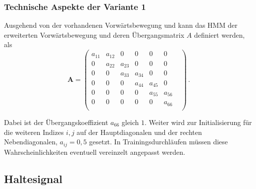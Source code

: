 \subsubsection{Technische Aspekte der Variante 1}
Ausgehend von der vorhandenen Vorw\"artsbewegung und kann das \acrshort{HMM} der erweiterten 
Vorw\"artsbewegung und deren \"Ubergangsmatrix $A$ definiert werden, als
\begin{equation}
\mathbf{A} = 
\begin{pmatrix}
a_{11} & a_{12} & 0 & 0 & 0 & 0 & \\
0 & a_{22} & a_{23} & 0 & 0 & 0 & \\
0 & 0 & a_{33} & a_{34} & 0 & 0 & \\
0 & 0 & 0 & a_{44} & a_{45} & 0 & \\
0 & 0 & 0 & 0 & a_{55} & a_{56} & \\
0 & 0 & 0 & 0 & 0 & a_{66} \\
\end{pmatrix} \, .
\end{equation}

Dabei ist der \"Ubergangskoeffizient $a_{66}$ gleich $1$. Weiter wird zur Initialisierung f\"ur die weiteren Indizes $i, j$ auf der Hauptdiagonalen und der rechten Nebendiagonalen, $a_{ij} = 0,5$ gesetzt. In Trainingsdurchl\"aufen m\"ussen diese Wahrscheinlichkeiten eventuell vereinzelt angepasst werden.

\subsection{Haltesignal}

